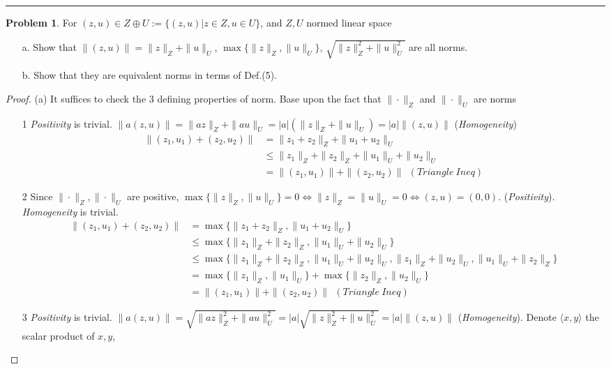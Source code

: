\documentclass[a4paper, 10pt]{article}
\theoremstyle{definition}
\newtheorem{problem}{Problem}
\theoremstyle{hSol}
\begin{document}
\noindent\rule{16cm}{0.4pt}
\begin{problem} For $(z,u)\in Z \oplus U:=\{(z,u)|z\in Z, u\in U\}$, and $Z,U$ normed linear space
\begin{itemize}
	\item[a.] Show that $\|(z,u)\|=\|z\|_Z+\|u\|_U$, $\max\{\|z\|_Z,\|u\|_U\}$, $\sqrt{\|z\|_Z^2+\|u\|_U^2}$ are all norms.
	\item[b.] Show that they are equivalent norms in terms of Def.(5).
\end{itemize}
\end{problem}
\begin{proof} (a) It suffices to check the 3 defining properties of norm. Base upon the fact that $\|\cdot\|_Z$ and $\|\cdot\|_U$ are norms
\begin{itemize}
   \item[1] \textit{Positivity} is trivial. $\|a(z,u)\|=\|az\|_Z+\|au\|_U=|a|(\|z\|_Z+\|u\|_U)=|a|\|(z,u)\|$ (\textit{Homogeneity})
   \begin{equation}
    \begin{split}
      \|(z_1,u_1)+(z_2,u_2)\| &= \|z_1+z_2\|_Z+\|u_1+u_2\|_U \\
      &\leq \|z_1\|_Z+\|z_2\|_Z+\|u_1\|_U+\|u_2\|_U \\
      &= \|(z_1,u_1)\| + \|(z_2, u_2)\| ~~(Triangle~Ineq)
    \end{split}
   \end{equation}
   \item[2] Since $\|\cdot\|_Z, \|\cdot\|_U$ are positive, $\max\{\|z\|_Z,\|u\|_U\}=0 \iff \|z\|_Z=\|u\|_U=0 \iff (z,u)=(0,0)$. (\textit{Positivity}). \textit{Homogeneity} is trivial.
   \begin{equation}
     \begin{split}
       \|(z_1,u_1)+(z_2,u_2)\| &= \max\{\|z_1+z_2\|_Z,\|u_1+u_2\|_U\}\\
       &\leq \max\{\|z_1\|_Z+\|z_2\|_Z,\|u_1\|_U+\|u_2\|_U\}\\
       &\leq \max\{\|z_1\|_Z+\|z_2\|_Z,\|u_1\|_U+\|u_2\|_U, \|z_1\|_Z+\|u_2\|_U, \|u_1\|_U+\|z_2\|_Z\}\\
       &= \max\{\|z_1\|_Z, \|u_1\|_U\} + \max\{\|z_2\|_Z, \|u_2\|_U\} \\
       &= \|(z_1,u_1)\| + \|(z_2, u_2)\| ~~(Triangle~Ineq)
     \end{split}
   \end{equation}
   \item[3] \textit{Positivity} is trivial. $\|a(z,u)\|=\sqrt{\|az\|_Z^2+\|au\|_U^2}=|a|\sqrt{\|z\|_Z^2+\|u\|_U^2}=|a|\|(z,u)\|$ (\textit{Homogeneity}). Denote $\langle x, y \rangle$ the scalar product of $x,y$,

\end{itemize}
\end{proof}
\end{document}
